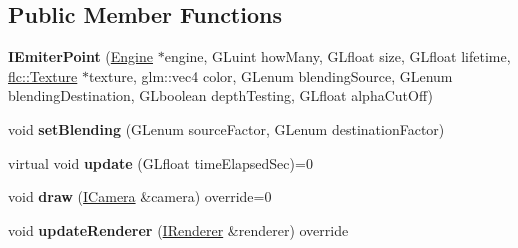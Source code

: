 \subsection*{Public Member Functions}
\begin{DoxyCompactItemize}
\item 
{\bfseries I\+Emiter\+Point} (\hyperlink{classflw_1_1Engine}{Engine} $\ast$engine, G\+Luint how\+Many, G\+Lfloat size, G\+Lfloat lifetime, \hyperlink{classflw_1_1flc_1_1Texture}{flc\+::\+Texture} $\ast$texture, glm\+::vec4 color, G\+Lenum blending\+Source, G\+Lenum blending\+Destination, G\+Lboolean depth\+Testing, G\+Lfloat alpha\+Cut\+Off)\hypertarget{classflw_1_1flf_1_1IEmiterPoint_a1f761af10d0b44e2847ea0f2150cdc0e}{}\label{classflw_1_1flf_1_1IEmiterPoint_a1f761af10d0b44e2847ea0f2150cdc0e}

\item 
void {\bfseries set\+Blending} (G\+Lenum source\+Factor, G\+Lenum destination\+Factor)\hypertarget{classflw_1_1flf_1_1IEmiterPoint_ad59e7a2e8b4559a54657638aa7249c8b}{}\label{classflw_1_1flf_1_1IEmiterPoint_ad59e7a2e8b4559a54657638aa7249c8b}

\item 
virtual void {\bfseries update} (G\+Lfloat time\+Elapsed\+Sec)=0\hypertarget{classflw_1_1flf_1_1IEmiterPoint_a7bfbe34cfbcf3222ab5e9068aedb3962}{}\label{classflw_1_1flf_1_1IEmiterPoint_a7bfbe34cfbcf3222ab5e9068aedb3962}

\item 
void {\bfseries draw} (\hyperlink{classflw_1_1flf_1_1ICamera}{I\+Camera} \&camera) override=0\hypertarget{classflw_1_1flf_1_1IEmiterPoint_aeffded615ab4356617b62556f6f13456}{}\label{classflw_1_1flf_1_1IEmiterPoint_aeffded615ab4356617b62556f6f13456}

\item 
void {\bfseries update\+Renderer} (\hyperlink{classflw_1_1flf_1_1IRenderer}{I\+Renderer} \&renderer) override\hypertarget{classflw_1_1flf_1_1IEmiterPoint_a1945d37be66cb8ef17f3f6d96f146dcc}{}\label{classflw_1_1flf_1_1IEmiterPoint_a1945d37be66cb8ef17f3f6d96f146dcc}

\end{DoxyCompactItemize}
